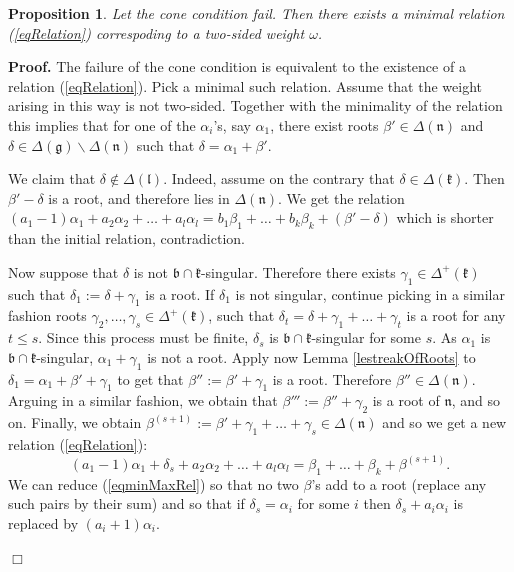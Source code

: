 \documentclass[12pt]{report}
\newtheorem{prop}[theo]{Proposition}
\newenvironment{proof}[1][]{ \textbf{Proof#1. }}{$\Box$\medskip}
\newcommand{\kk}{\mathfrak{k}}
\newcommand{\nn}{\mathfrak{n}}
\newcommand{\gG}{\mathfrak{g}}
\newcommand{\bb}{\mathfrak{b}}
\newcommand{\lL}{\mathfrak{l}}
\newcommand{\refle}[1]{Lemma \ref{#1}}
\newcommand{\refeq}[1]{(\ref{#1})}
\begin{document}
\begin{prop}\label{propabundanceHolds}
Let the cone condition fail. Then there exists a minimal relation (\ref{eqRelation}) correspoding to a two-sided weight $\omega$.
\end{prop}
\begin{proof}
The failure of the cone condition is equivalent to the existence of a relation \refeq{eqRelation}. Pick a minimal such relation. Assume that the weight arising in this way is not two-sided. Together with the minimality of the relation this implies that for one of the $\alpha_i$'s, say $\alpha_1$, there exist roots $\beta'\in\Delta(\nn)$ and $\delta\in\Delta(\gG)\backslash\Delta(\nn)$ such that $\delta= \alpha_{1}+\beta'$.

We claim that $\delta\notin\Delta(\lL)$. Indeed, assume on the contrary that $\delta\in\Delta(\kk)$. Then $\beta'-\delta$ is a root, and therefore lies in $\Delta(\nn)$. We get the relation $(a_1-1)\alpha_1+a_2\alpha_2+ \dots+ a_l\alpha_l = b_1\beta_1 +\dots+b_k\beta_k+(\beta'-\delta)$ which is shorter than the initial relation, contradiction. 

Now suppose that $\delta$ is not $\bb\cap\kk$-singular. Therefore there exists $\gamma_1\in\Delta^+(\kk)$ such that $\delta_1 :=\delta + \gamma_1$ is a root. If $\delta_1$ is not singular, continue picking in a similar fashion roots $\gamma_2,\dots , \gamma_s \in \Delta^+(\kk)$, such that $\delta_t= \delta+ \gamma_1+ \dots +\gamma_t$ is a root for any $t\leq s$. Since this process must be finite, $\delta_s$ is $\bb\cap\kk$-singular for some $s$. As $\alpha_1$ is $\bb\cap\kk$-singular, $\alpha_1 +\gamma_1$ is not a root.  Apply now \refle{lestreakOfRoots} to $\delta_1=\alpha_1+\beta'+\gamma_1$ to get that $\beta'':=\beta'+\gamma_1$ is a root. Therefore $\beta''\in\Delta(\nn)$. Arguing in a similar fashion, we obtain that $\beta''':=\beta''+ \gamma_2$ is a root of $\nn$, and so on. Finally, we obtain $\beta^{(s+1)}:=\beta'+\gamma_1+\dots +\gamma_{s}\in\Delta(\nn)$ and so we get a new relation \refeq{eqRelation}:
\begin{equation}\label{eqminMaxRel}
(a_1-1)\alpha_1+ \delta_s+a_2\alpha_2+\dots+a_l\alpha_l=\beta_1+\dots +\beta_k+\beta^{(s+1)}.
\end{equation}
We can reduce \refeq{eqminMaxRel} so that no two $\beta$'s add to a root (replace any such pairs by their sum) and so that if $\delta_s=\alpha_i$ for some $i$ then $\delta_s+a_i\alpha_i$ is replaced by $(a_i+1)\alpha_i$. %


\end{proof}
\end{document}
